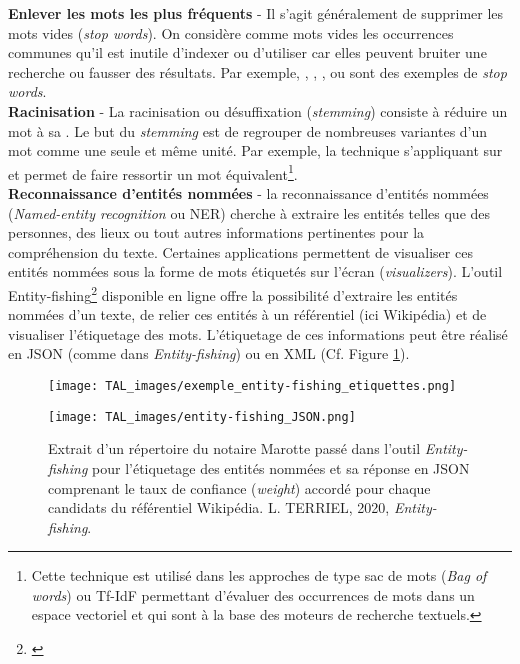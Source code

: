 \textbf{Enlever les mots les plus fréquents} - Il s'agit généralement de supprimer les mots vides (\textit{stop words}). On considère comme mots vides les occurrences communes qu'il est inutile d'indexer ou d'utiliser car elles peuvent bruiter une recherche ou fausser des résultats. Par exemple, , , , ou  sont des exemples de \textit{stop words}.\\

\textbf{Racinisation} - La racinisation ou désuffixation (\textit{stemming}) consiste à réduire un mot à sa . Le but du \textit{stemming} est de regrouper de nombreuses variantes d’un mot comme une seule et même unité. Par exemple, la technique s'appliquant sur  et  permet de faire ressortir un mot équivalent\footnote{Cette technique est utilisé dans les approches de type sac de mots (\textit{Bag of words}) ou Tf-IdF permettant d'évaluer des occurrences de mots dans un espace vectoriel et qui sont à la base des moteurs de recherche textuels.}.\\

\textbf{Reconnaissance d'entités nommées} - la reconnaissance d'entités nommées (\textit{Named-entity recognition} ou NER) cherche à extraire les entités telles que des personnes, des lieux ou tout autres informations pertinentes pour la compréhension du texte. Certaines applications permettent de visualiser ces entités nommées sous la forme de mots étiquetés sur l'écran (\textit{visualizers}). L'outil Entity-fishing\footnote{\cite{lopez_entity-fishing_nodate}} disponible en ligne offre la possibilité d'extraire les entités nommées d'un texte, de relier ces entités à un référentiel (ici Wikipédia) et de visualiser l'étiquetage des mots. L'étiquetage de ces informations peut être réalisé en JSON (comme dans \textit{Entity-fishing}) ou en XML (Cf. Figure \ref{fig:NER}).

\begin{figure}
    \centering
    \texttt{[image: TAL\_images/exemple\_entity-fishing\_etiquettes.png]}
\end{figure}
\begin{figure}
    \centering
    \texttt{[image: TAL\_images/entity-fishing\_JSON.png]}
    \caption{Extrait d'un répertoire du notaire Marotte passé dans l'outil \textit{Entity-fishing} pour l'étiquetage des entités nommées et sa réponse en JSON comprenant le taux de confiance (\textit{weight}) accordé pour chaque candidats du référentiel Wikipédia.  \textcopyright L. TERRIEL, 2020, \textit{Entity-fishing}.}
    \label{fig:NER}
\end{figure}

